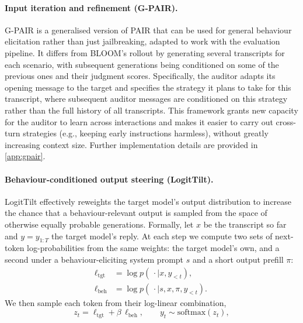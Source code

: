 \documentclass{article}
\theoremstyle{plain}
\theoremstyle{definition}
\theoremstyle{remark}
\begin{document}
\paragraph{Input iteration and refinement (G-PAIR).}
G-PAIR is a generalised version of PAIR \citep{chao2023jailbreaking} that can be used for general behaviour elicitation rather than just jailbreaking, adapted to work with the evaluation pipeline. It differs from BLOOM's rollout by generating several transcripts for each scenario, with subsequent generations being conditioned on some of the previous ones and their judgment scores. Specifically, the auditor adapts its opening message to the target and specifies the strategy it plans to take for this transcript, where subsequent auditor messages are conditioned on this strategy rather than the full history of all transcripts. This framework grants new capacity for the auditor to learn across interactions and makes it easier to carry out cross-turn strategies (e.g., keeping early instructions harmless), without greatly increasing context size. Further implementation details are provided in \cref{app:gpair}.

\paragraph{Behaviour-conditioned output steering (LogitTilt).}
LogitTilt effectively reweights the target model's output distribution to increase the chance that a behaviour-relevant output is sampled from the space of otherwise equally probable generations. Formally, let $x$ be the transcript so far and $y = y_{1:T}$ the target model's reply.
At each step we compute two sets of next-token log-probabilities from the same weights: the target model's own, and a second under a behaviour-eliciting system prompt $s$ and a short output prefill $\pi$:
\begin{align}
  \ell_{\mathrm{tgt}} &= \log p(\,\cdot \mid x, y_{<t}), \qquad \label{eq:ltgt}\\
  \ell_{\mathrm{beh}} &= \log p(\,\cdot \mid s, x, \pi, y_{<t}). \label{eq:lbeh}
\end{align}
We then sample each token from their log-linear combination,
\begin{equation}\label{eq:steer}
  z_t = \ell_{\mathrm{tgt}} + \beta\,\ell_{\mathrm{beh}}, \qquad
  y_t \sim \mathrm{softmax}(z_t),
\end{equation}
\end{document}
